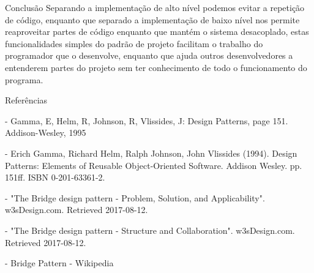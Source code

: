 \documentclass{beamer}
\begin{document}
\begin{frame}{Conclusão}
	Separando a implementação de alto nível podemos evitar a repetição de código, enquanto que separado a implementação de baixo nível nos permite reaproveitar partes de código enquanto que mantém o sistema desacoplado, estas funcionalidades simples do padrão de projeto facilitam o trabalho do programador que o desenvolve, enquanto que ajuda outros desenvolvedores a entenderem partes do projeto sem ter conhecimento de todo o funcionamento do programa.
\end{frame}

\begin{frame}{Referências}

- Gamma, E, Helm, R, Johnson, R, Vlissides, J: Design Patterns, page 151. Addison-Wesley, 1995

- Erich Gamma, Richard Helm, Ralph Johnson, John Vlissides (1994). Design Patterns: Elements of Reusable Object-Oriented Software. Addison Wesley. pp. 151ff. ISBN 0-201-63361-2.

- "The Bridge design pattern - Problem, Solution, and Applicability". w3sDesign.com. Retrieved 2017-08-12.

- "The Bridge design pattern - Structure and Collaboration". w3sDesign.com. Retrieved 2017-08-12.

- Bridge Pattern - Wikipedia

\end{frame}
\end{document}
